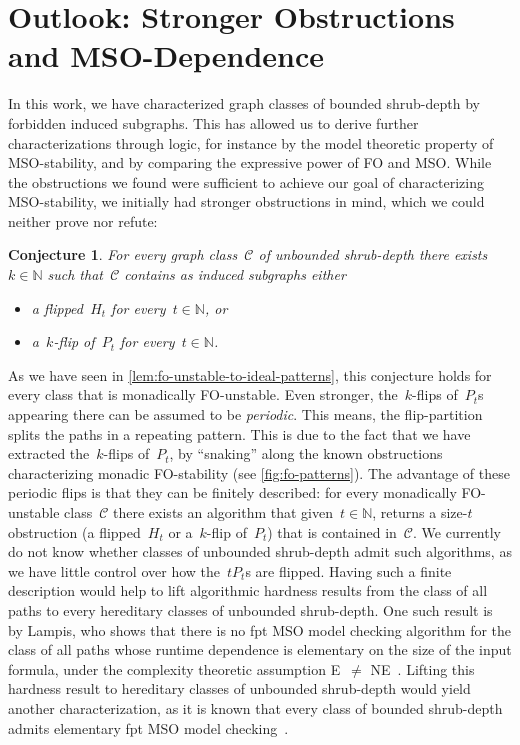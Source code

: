\documentclass[11pt]{article}      \usepackage[margin=1in]{geometry}  \usepackage{microtype}
\newtheorem{conjecture}[theorem]{Conjecture}
\theoremstyle{definition}
\newcommand{\N}[0]{\mathrm{\mathbb{N}}}
\newcommand{\CC}{\mathcal{C}}
\begin{document}
  
\section{Outlook: Stronger Obstructions and MSO-Dependence}\label{sec:outlook}
In this work, we have characterized graph classes of bounded shrub-depth by forbidden induced subgraphs.
This has allowed us to derive further characterizations through logic, for instance by the model theoretic property of MSO-stability, and by comparing the expressive power of FO and MSO.
While the obstructions we found were sufficient to achieve our goal of characterizing MSO-stability, we initially had stronger obstructions in mind, which we could neither prove nor refute:

\begin{conjecture}
    For every graph class~$\CC$ of unbounded shrub-depth there exists~$k\in\N$ such that~$\CC$ contains as induced subgraphs either
    \begin{itemize}
      \item a flipped~$H_t$ for every~$t\in\N$, or
      \item a~$k$-flip of~$P_t$ for every~$t \in \N$.
    \end{itemize}
\end{conjecture}

As we have seen in \cref{lem:fo-unstable-to-ideal-patterns}, this conjecture holds for every class that is monadically FO-unstable.
Even stronger, the~$k$-flips of~$P_t$s appearing there can be assumed to be \emph{periodic}.
This means, the flip-partition splits the paths in a repeating pattern. This is due to the fact that we have extracted the~$k$-flips of~$P_t$, by ``snaking'' along the known obstructions characterizing monadic FO-stability (see \cref{fig:fo-patterns}).
The advantage of these periodic flips is that they can be finitely described:
for every monadically FO-unstable class~$\CC$ there exists an algorithm that given~$t\in\N$, returns a size-$t$ obstruction (a flipped~$H_t$ or a~$k$-flip of~$P_t$) that is contained in~$\CC$.
We currently do not know whether classes of unbounded shrub-depth admit such algorithms, as we have little control over how the~$tP_t$s are flipped.
Having such a finite description would help to lift algorithmic hardness results from the class of all paths to every hereditary classes of unbounded shrub-depth.
One such result is by Lampis, who shows that there is no fpt MSO model checking algorithm for the class of all paths whose runtime dependence is elementary on the size of the input formula, under the complexity theoretic assumption E~$\neq$ NE~\cite{lampis2014lower}.
Lifting this hardness result to hereditary classes of unbounded shrub-depth would yield another characterization, as it is known that every class of bounded shrub-depth admits elementary fpt MSO model checking~\cite{gajarsky2015kernelizing,shrubdepth}.
\end{document}
